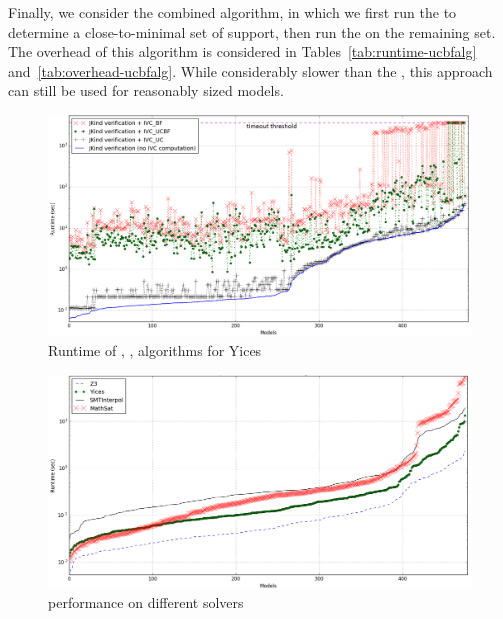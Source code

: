 
Finally, we consider the combined \ucbfalg algorithm, in which we first run the \ucalg to determine a close-to-minimal set of support, then run the \bfalg on the remaining set.  The overhead of this algorithm is considered in Tables~\ref{tab:runtime-ucbfalg} and~\ref{tab:overhead-ucbfalg}.  While considerably slower than the \ucalg, this approach can still be used for reasonably sized models.

\begin{figure}
  \centering
  \includegraphics[width=\textwidth]{figs/timing_analyses.png}
  \vspace{-0.3in}
  \caption{Runtime of \bfalg, \ucbfalg, \ucalg algorithms for Yices}\label{fig:runtimeall}
\end{figure}

\begin{figure}
  \centering
  \includegraphics[width=\textwidth]{figs/performance.png}
  \vspace{-0.3in}
  \caption{\ucalg performance on different solvers}\label{fig:performance}
\end{figure}

